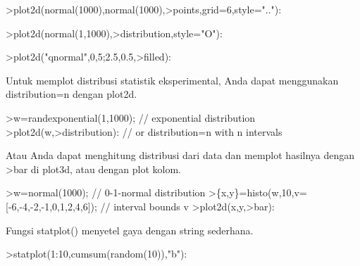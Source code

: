\documentclass{article}
\begin{document}
\begin{eulernotebook}
\begin{eulercomment}
\begin{eulercomment}
\begin{eulercomment}
\begin{eulercomment}
\begin{eulercomment}
\begin{eulercomment}
\begin{eulercomment}
\begin{eulercomment}
\begin{eulercomment}
\begin{eulercomment}
\begin{eulercomment}
\begin{eulercomment}
\begin{eulercomment}
\begin{eulercomment}
\begin{eulercomment}
\begin{eulercomment}
\begin{eulercomment}
\begin{eulercomment}
\begin{eulercomment}
\begin{eulercomment}
\begin{eulercomment}
\begin{eulercomment}
\begin{eulercomment}
\begin{eulercomment}
\begin{eulercomment}
\begin{eulercomment}
\begin{eulerprompt}
>plot2d(normal(1000),normal(1000),>points,grid=6,style=".."):
\end{eulerprompt}
\begin{eulerprompt}
>plot2d(normal(1,1000),>distribution,style="O"):
\end{eulerprompt}
\begin{eulerprompt}
>plot2d("qnormal",0,5;2.5,0.5,>filled):
\end{eulerprompt}
\begin{eulercomment}
Untuk memplot distribusi statistik eksperimental, Anda dapat
menggunakan distribution=n dengan plot2d.
\end{eulercomment}
\begin{eulerprompt}
>w=randexponential(1,1000); // exponential distribution
>plot2d(w,>distribution): // or distribution=n with n intervals
\end{eulerprompt}
\begin{eulercomment}
Atau Anda dapat menghitung distribusi dari data dan memplot hasilnya
dengan \textgreater{}bar di plot3d, atau dengan plot kolom.
\end{eulercomment}
\begin{eulerprompt}
>w=normal(1000); // 0-1-normal distribution
>\{x,y\}=histo(w,10,v=[-6,-4,-2,-1,0,1,2,4,6]); // interval bounds v
>plot2d(x,y,>bar):
\end{eulerprompt}
\begin{eulercomment}
Fungsi statplot() menyetel gaya dengan string sederhana.
\end{eulercomment}
\begin{eulerprompt}
>statplot(1:10,cumsum(random(10)),"b"):
\end{eulerprompt}

\end{eulercomment}
\end{eulercomment}
\end{eulercomment}
\end{eulercomment}
\end{eulercomment}
\end{eulercomment}
\end{eulercomment}
\end{eulercomment}
\end{eulercomment}
\end{eulercomment}
\end{eulercomment}
\end{eulercomment}
\end{eulercomment}
\end{eulercomment}
\end{eulercomment}
\end{eulercomment}
\end{eulercomment}
\end{eulercomment}
\end{eulercomment}
\end{eulercomment}
\end{eulercomment}
\end{eulercomment}
\end{eulercomment}
\end{eulercomment}
\end{eulercomment}
\end{eulercomment}
\end{eulernotebook}
\end{document}
